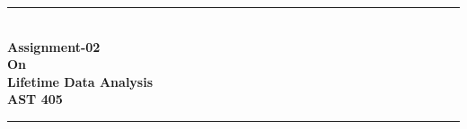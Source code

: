 \documentclass[
  12pt,
  oneside]{article}
\author{}
\date{\vspace{-2.5em}}
\begin{document}
%
%
%



\begin{titlepage}

\newcommand{\HRule}{\rule{\linewidth}{0.5mm}} %

\center %

%


\begin{minipage}{3cm}
\vspace{3cm}
\end{minipage}


\HRule \\[0.25cm]
{ \huge \bfseries Assignment-02}\\[0.06cm]
{ \huge \bfseries On}\\[0.1cm]
{ \huge \bfseries Lifetime Data Analysis}\\[0.08cm]
{ \LARGE \bfseries AST 405}\\[0.05cm]
\HRule \\[1.5cm]



\end{titlepage}
\end{document}
